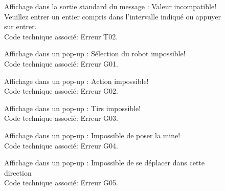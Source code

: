 \documentclass[12pt,a4paper]{article}
\begin{document}
\begin{itemize}
		 \begin{figure}[H]
		   \caption{
		    	\label{E2} %
		    	Affichage dans la sortie standard du message : Valeur incompatible! Veuillez entrer un entier compris dans l'intervalle indiqué ou appuyer sur entrer. \\
		    	Code technique associé: Erreur T02.
		    }
		\end{figure}

		\begin{figure}[H]
		   \caption{
		    	\label{E3} %
		    	Affichage dans un pop-up : Sélection du robot impossible! \\
		    	Code technique associé: Erreur G01.
		    }
		\end{figure}

		\begin{figure}[H]
		   \caption{
		    	\label{E4} %
		    	Affichage dans un pop-up : Action impossible! \\
		    	Code technique associé: Erreur G02.
		    }
		\end{figure}

		\begin{figure}[H]
		   \caption{
		    	\label{E5} %
		    	Affichage dans un pop-up : Tirs impossible! \\
		    	Code technique associé: Erreur G03.
		    }
		\end{figure}

		\begin{figure}[H]
		   \caption{
		    	\label{E6} %
		    	Affichage dans un pop-up : Impossible de poser la mine! \\
		    	Code technique associé: Erreur G04.
		    }
		\end{figure}

		\begin{figure}[H]
		   \caption{
		    	\label{E7} %
		    	Affichage dans un pop-up :  Impossible de se déplacer dans cette direction\\
		    	Code technique associé: Erreur G05.
		    }
		\end{figure}


\end{itemize}
\end{document}
